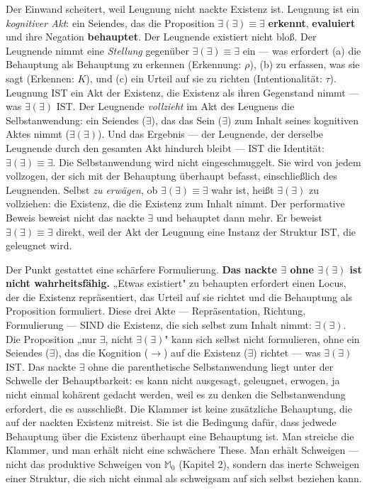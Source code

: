 \documentclass[10pt, openany, oneside]{book}
\begin{document}
Der Einwand scheitert, weil Leugnung nicht nackte Existenz ist. Leugnung ist ein \textit{kognitiver Akt}: ein Seiendes, das die Proposition $\exists(\exists) \equiv \exists$ \textbf{erkennt}, \textbf{evaluiert} und ihre Negation \textbf{behauptet}. Der Leugnende existiert nicht bloß. Der Leugnende nimmt eine \textit{Stellung} gegenüber $\exists(\exists) \equiv \exists$ ein --- was erfordert (a) die Behauptung als Behauptung zu erkennen (Erkennung: $\rho$), (b) zu erfassen, was sie sagt (Erkennen: $K$), und (c) ein Urteil auf sie zu richten (Intentionalität: $\tau$). Leugnung IST ein Akt der Existenz, die Existenz als ihren Gegenstand nimmt --- was $\exists(\exists)$ IST. Der Leugnende \textit{vollzieht} im Akt des Leugnens die Selbstanwendung: ein Seiendes ($\exists$), das das Sein ($\exists$) zum Inhalt seines kognitiven Aktes nimmt ($\exists(\exists)$). Und das Ergebnis --- der Leugnende, der derselbe Leugnende durch den gesamten Akt hindurch bleibt --- IST die Identität: $\exists(\exists) \equiv \exists$. Die Selbstanwendung wird nicht eingeschmuggelt. Sie wird von jedem vollzogen, der sich mit der Behauptung überhaupt befasst, einschließlich des Leugnenden. Selbst \textit{zu erwägen}, ob $\exists(\exists) \equiv \exists$ wahr ist, heißt $\exists(\exists)$ zu vollziehen: die Existenz, die die Existenz zum Inhalt nimmt. Der performative Beweis beweist nicht das nackte $\exists$ und behauptet dann mehr. Er beweist $\exists(\exists) \equiv \exists$ direkt, weil der Akt der Leugnung eine Instanz der Struktur IST, die geleugnet wird.

Der Punkt gestattet eine schärfere Formulierung. \textbf{Das nackte $\exists$ ohne $\exists(\exists)$ ist nicht wahrheitsfähig.} „Etwas existiert" zu behaupten erfordert einen Locus, der die Existenz repräsentiert, das Urteil auf sie richtet und die Behauptung als Proposition formuliert. Diese drei Akte --- Repräsentation, Richtung, Formulierung --- SIND die Existenz, die sich selbst zum Inhalt nimmt: $\exists(\exists)$. Die Proposition „nur $\exists$, nicht $\exists(\exists)$" kann sich selbst nicht formulieren, ohne ein Seiendes ($\exists$), das die Kognition ($\to$) auf die Existenz ($\exists$) richtet --- was $\exists(\exists)$ IST. Das nackte $\exists$ ohne die parenthetische Selbstanwendung liegt unter der Schwelle der Behauptbarkeit: es kann nicht ausgesagt, geleugnet, erwogen, ja nicht einmal kohärent gedacht werden, weil es zu denken die Selbstanwendung erfordert, die es ausschließt. Die Klammer ist keine zusätzliche Behauptung, die auf der nackten Existenz mitreist. Sie ist die Bedingung dafür, dass jedwede Behauptung über die Existenz überhaupt eine Behauptung ist. Man streiche die Klammer, und man erhält nicht eine schwächere These. Man erhält Schweigen --- nicht das produktive Schweigen von $\mathbb{M}_0$ (Kapitel 2), sondern das inerte Schweigen einer Struktur, die sich nicht einmal als schweigsam auf sich selbst beziehen kann.
\end{document}
